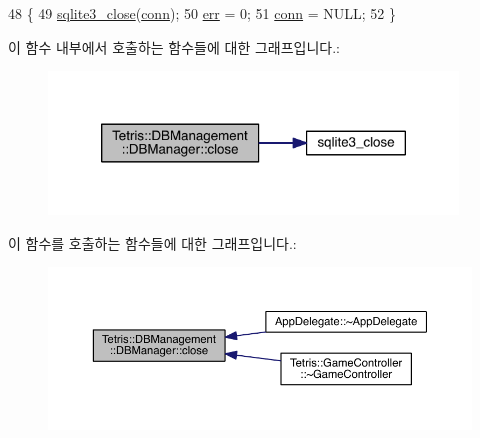 \begin{DoxyCode}
48                         \{
49                 \hyperlink{sqlite3_8h_ac43c9032fc6ef3b2a231dc3a9fa44b2d}{sqlite3\_close}(\hyperlink{class_tetris_1_1_d_b_management_1_1_d_b_manager_acc2c19420c2b1b1b2c1e724b3a8ec4b7}{conn});
50                 \hyperlink{class_tetris_1_1_d_b_management_1_1_d_b_manager_a9ea8d963f1a9b8117fa5e92b54eda114}{err} = 0;
51                 \hyperlink{class_tetris_1_1_d_b_management_1_1_d_b_manager_acc2c19420c2b1b1b2c1e724b3a8ec4b7}{conn} = NULL;
52             \}
\end{DoxyCode}
이 함수 내부에서 호출하는 함수들에 대한 그래프입니다.\+:
\nopagebreak
\begin{figure}[H]
\begin{center}
\leavevmode
\includegraphics[width=308pt]{da/d79/class_tetris_1_1_d_b_management_1_1_d_b_manager_a8390e6ddf3fa06e90fa5c2ab4997e5c1_cgraph}
\end{center}
\end{figure}
이 함수를 호출하는 함수들에 대한 그래프입니다.\+:
\nopagebreak
\begin{figure}[H]
\begin{center}
\leavevmode
\includegraphics[width=350pt]{da/d79/class_tetris_1_1_d_b_management_1_1_d_b_manager_a8390e6ddf3fa06e90fa5c2ab4997e5c1_icgraph}
\end{center}
\end{figure}
\mbox{\label{class_tetris_1_1_d_b_management_1_1_d_b_manager_a5d49e7fac7d2a65973151a7fb81ea560}} 
